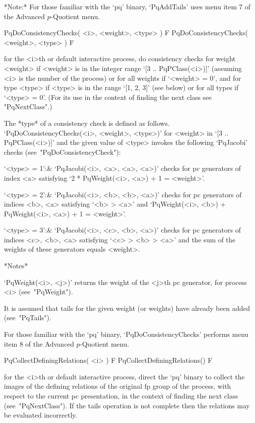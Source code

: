 *Note:*
For those familiar with the `pq' binary, `PqAddTails' uses menu item 7 of
the Advanced $p$-Quotient menu.

\>PqDoConsistencyChecks( <i>, <weight>, <type> ) F
\>PqDoConsistencyChecks( <weight>, <type> ) F

for the <i>th or default interactive  {\ANUPQ}  process,  do  consistency
checks for weight <weight> if <weight> is in the  integer  range  `[3  ..
PqPClass(<i>)]' (assuming <i> is the number of the process)  or  for  all
weights if `<weight> = 0', and for type <type> if <type> is in the  range
`[1, 2, 3]' (see below) or for all types if `<type> = 0'. (For its use in
the context of finding the next class see "PqNextClass".)

The  *type*   of   a   consistency   check   is   defined   as   follows.
`PqDoConsistencyChecks(<i>, <weight>, <type>)' for  <weight>  in  `[3  ..
PqPClass(<i>)]' and the given  value  of  <type>  invokes  the  following
`PqJacobi' checks (see~"PqDoConsistencyCheck"):

\beginitems

`<type> = 1':&
`PqJacobi(<i>, <a>, <a>, <a>)' checks for  pc  generators  of  index  <a>
satisfying `2 * PqWeight(<i>, <a>) + 1 = <weight>'.

`<type> = 2':&
`PqJacobi(<i>, <b>, <b>, <a>)' checks for pc generators of  indices  <b>,
<a> satisfying `<b> > <a>' and `PqWeight(<i>, <b>) + PqWeight(<i>, <a>) +
1 = <weight>'.

`<type> = 3':&
`PqJacobi(<i>, <c>, <b>, <a>)' checks for pc generators of  indices  <c>,
<b>, <a> satisfying `<c> > <b> > <a>' and the sum of the weights of these
generators equals <weight>.

\enditems

*Notes*

`PqWeight(<i>, <j>)' returns the weight of the <j>th  pc  generator,  for
process <i> (see~"PqWeight").

It is assumed that tails for the given weight (or weights)  have  already
been added (see~"PqTails").

For those familiar with the `pq' binary, `PqDoConsistencyChecks' performs
menu item 8 of the Advanced $p$-Quotient menu.

\>PqCollectDefiningRelations( <i> ) F
\>PqCollectDefiningRelations() F

for the <i>th or default interactive {\ANUPQ} process,  direct  the  `pq'
binary to collect the images of the defining relations of the original fp
group of the process, with respect to the current pc presentation, in the
context of finding the  next  class  (see~"PqNextClass").  If  the  tails
operation  is  not  complete  then  the  relations   may   be   evaluated
incorrectly.

